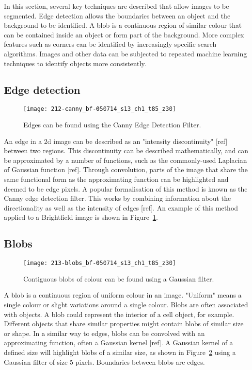 In this section, several key techniques are described that allow images to be segmented. Edge detection allows the boundaries between an object and the background to be identified. A blob is a continuous region of similar colour that can be contained inside an object or form part of the background. More complex features such as corners can be identified by increasingly specific search algorithms. Images and other data can be subjected to repeated machine learning techniques to identify objects more consistently.

\subsection{Edge detection}

\begin{figure}[htbp!]
\centering
\texttt{[image: 212-canny\_bf-050714\_s13\_ch1\_t85\_z30]}
\caption[The canny filter]{Edges can be found using the Canny Edge Detection Filter.}
\label{fig:canny_filter_bf}
\end{figure}

An edge in a 2d image can be described as an "intensity discontinuity" [ref] between two regions. This discontinuity can be described mathematically, and can be approximated by a number of functions, such as the commonly-used Laplacian of Gaussian function [ref]. Through convolution, parts of the image that share the same functional form as the approximating function can be highlighted and deemed to be edge pixels. A popular formalisation of this method is known as the Canny edge detection filter. This works by combining information about the directionality as well as the intensity of edges [ref]. An example of this method applied to a Brightfield image is shown in Figure~\ref{fig:canny_filter_bf}.

\subsection{Blobs}

\begin{figure}[htbp!]
\centering
\texttt{[image: 213-blobs\_bf-050714\_s13\_ch1\_t85\_z30]}
\caption[Blob detection]{Contiguous blobs of colour can be found using a Gaussian filter.}
\label{fig:blob_detection_bf}
\end{figure}

A blob is a continuous region of uniform colour in an image. "Uniform" means a single colour or slight variations around a single colour. Blobs are often associated with objects. A blob could represent the interior of a cell object, for example. Different objects that share similar properties might contain blobs of similar size or shape. In a similar way to edges, blobs can be convolved with an approximating function, often a Gaussian kernel [ref]. A Gaussian kernel of a defined size will highlight blobs of a similar size, as shown in Figure~\ref{fig:blob_detection_bf} using a Gaussian filter of size 5 pixels. Boundaries between blobs are edges.

